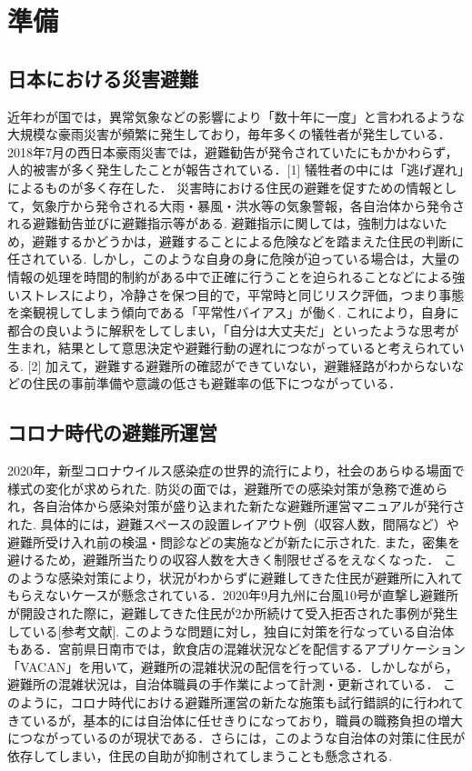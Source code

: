 \documentclass[technicalreport,dvipdfmx]{ieicej}
\begin{document}
\section{準備}
\subsection{日本における災害避難} 
近年わが国では，異常気象などの影響により「数十年に一度」と言われるような大規模な豪雨災害が頻繁に発生しており，毎年多くの犠牲者が発生している． 2018年7月の西日本豪雨災害では，避難勧告が発令されていたにもかかわらず，人的被害が多く発生したことが報告されている．[1] 犠牲者の中には「逃げ遅れ」によるものが多く存在した．
災害時における住民の避難を促すための情報として，気象庁から発令される大雨・暴風・洪水等の気象警報，各自治体から発令される避難勧告並びに避難指示等がある. 避難指示に関しては，強制力はないため，避難するかどうかは，避難することによる危険などを踏まえた住民の判断に任されている. しかし，このような自身の身に危険が迫っている場合は，大量の情報の処理を時間的制約がある中で正確に行うことを迫られることなどによる強いストレスにより，冷静さを保つ目的で，平常時と同じリスク評価，つまり事態を楽観視してしまう傾向である「平常性バイアス」が働く. これにより，自身に都合の良いように解釈をしてしまい，「自分は大丈夫だ」といったような思考が生まれ，結果として意思決定や避難行動の遅れにつながっていると考えられている. [2] 加えて，避難する避難所の確認ができていない，避難経路がわからないなどの住民の事前準備や意識の低さも避難率の低下につながっている．

\subsection{コロナ時代の避難所運営}
2020年，新型コロナウイルス感染症の世界的流行により，社会のあらゆる場面で様式の変化が求められた. 防災の面では，避難所での感染対策が急務で進められ，各自治体から感染対策が盛り込まれた新たな避難所運営マニュアルが発行された. 具体的には，避難スペースの設置レイアウト例（収容人数，間隔など）や避難所受け入れ前の検温・問診などの実施などが新たに示された. また，密集を避けるため，避難所当たりの収容人数を大きく制限せざるをえなくなった．
このような感染対策により，状況がわからずに避難してきた住民が避難所に入れてもらえないケースが懸念されている．2020年9月九州に台風10号が直撃し避難所が開設された際に，避難してきた住民が2か所続けて受入拒否された事例が発生している[参考文献]. 
このような問題に対し，独自に対策を行なっている自治体もある．宮前県日南市では，飲食店の混雑状況などを配信するアプリケーション「VACAN」を用いて，避難所の混雑状況の配信を行っている．しかしながら，避難所の混雑状況は，自治体職員の手作業によって計測・更新されている．
このように，コロナ時代における避難所運営の新たな施策も試行錯誤的に行われてきているが，基本的には自治体に任せきりになっており，職員の職務負担の増大につながっているのが現状である．さらには，このような自治体の対策に住民が依存してしまい，住民の自助が抑制されてしまうことも懸念される. 
\end{document}
